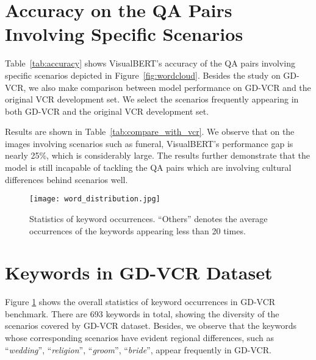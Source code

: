 \documentclass[11pt]{article}
\begin{document}
\section{Accuracy on the QA Pairs Involving Specific Scenarios}
\label{appendix:detailed_accuracy}
Table~\ref{tab:accuracy} shows VisualBERT's accuracy of the QA pairs involving specific scenarios depicted in Figure~\ref{fig:wordcloud}. Besides the study on GD-VCR, we also make comparison between model performance on GD-VCR and the original VCR development set. We select the scenarios frequently appearing in both GD-VCR and the original VCR development set. 

Results are shown in Table~\ref{tab:compare_with_vcr}. We observe that on the images involving scenarios such as funeral, VisualBERT's performance gap is nearly 25\%, which is considerably large. The results further demonstrate that the model is still incapable of tackling the QA pairs which are involving cultural differences behind scenarios well. 

\begin{figure}[t]
    \centering
    \texttt{[image: word\_distribution.jpg]}
    \caption{Statistics of keyword occurrences. ``Others'' denotes the average occurrences of the keywords appearing less than 20 times.}
    \label{fig:keyword_occurrences}
\end{figure}

\begin{table}[t]
\centering
{}
\caption{Accuracy (\%) on the images involving the same scenarios from the original VCR dataset and non-Western regions from GD-VCR dataset, respectively.}
    \label{tab:compare_with_vcr}
\end{table}

\section{Keywords in GD-VCR Dataset}
Figure \ref{fig:keyword_occurrences} shows the overall statistics of keyword occurrences in GD-VCR benchmark. There are 693 keywords in total, showing the diversity of the scenarios covered by GD-VCR dataset. Besides, we observe that the keywords whose corresponding scenarios have evident regional differences, such as ``\textit{wedding}'', ``\textit{religion}'', ``\textit{groom}'', ``\textit{bride}'', appear frequently in GD-VCR.  
\end{document}
